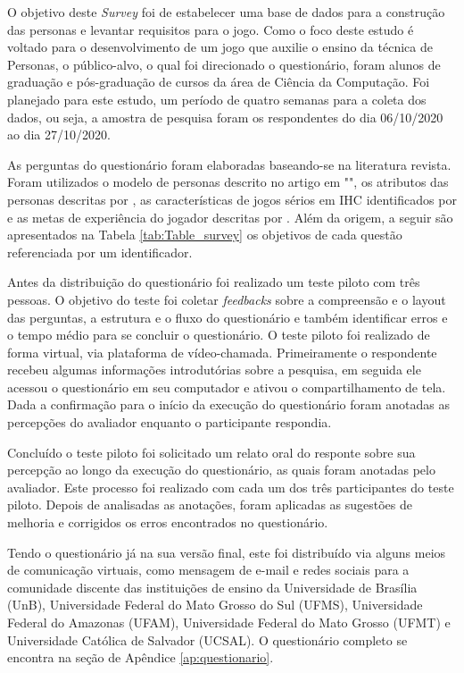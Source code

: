 \begin{apendicesenv}
O objetivo deste \textit{Survey} foi de estabelecer uma base de dados para a construção das personas e levantar requisitos para o jogo. Como o foco deste estudo é voltado para o desenvolvimento de um jogo que auxilie o ensino da técnica de Personas, o público-alvo, o qual foi direcionado o questionário, foram alunos de graduação e pós-graduação de cursos da área de Ciência da Computação. Foi planejado para este estudo, um período de quatro semanas para a coleta dos dados, ou seja, a amostra de pesquisa foram os respondentes do dia 06/10/2020 ao dia 27/10/2020. 

As perguntas do questionário foram elaboradas baseando-se na literatura revista. Foram utilizados o modelo de personas descrito no artigo em "\citeauthor{usability2020}", os atributos das personas descritas por , as características de jogos sérios em IHC identificados por  e as metas de experiência do jogador descritas por . Além da origem, a seguir são apresentados na Tabela \ref{tab:Table_survey} os objetivos de cada questão referenciada por um identificador.



Antes da distribuição do questionário foi realizado um teste piloto com três pessoas. O objetivo do teste foi coletar \textit{feedbacks} sobre a compreensão e o layout das perguntas, a estrutura e o fluxo do questionário e também identificar erros e o tempo médio para se concluir o questionário. O teste piloto foi realizado de forma virtual, via plataforma de vídeo-chamada. Primeiramente o respondente recebeu algumas informações introdutórias sobre a pesquisa, em seguida ele acessou o questionário em seu computador e ativou o compartilhamento de tela. Dada a confirmação para o início da execução do questionário foram anotadas as percepções do avaliador enquanto o participante respondia. 

Concluído o teste piloto foi solicitado um relato oral do responte sobre sua percepção ao longo da execução do questionário, as quais foram anotadas pelo avaliador. Este processo foi realizado com cada um dos três participantes do teste piloto. Depois de analisadas as anotações, foram aplicadas as sugestões de melhoria e corrigidos os erros encontrados no questionário. 

Tendo o questionário já na sua versão final, este foi distribuído via alguns meios de comunicação virtuais, como mensagem de e-mail e redes sociais para a comunidade discente das instituições de ensino da Universidade de Brasília (UnB), Universidade Federal do Mato Grosso do Sul (UFMS), Universidade Federal do Amazonas (UFAM), Universidade Federal do Mato Grosso (UFMT) e Universidade Católica de Salvador (UCSAL). O questionário completo se encontra na seção de Apêndice \ref{ap:questionario}. 


\end{apendicesenv}
